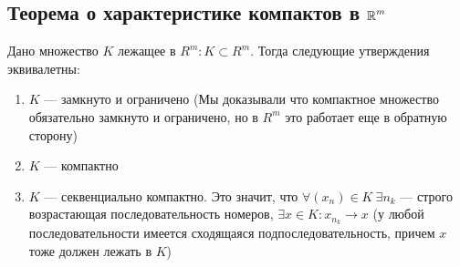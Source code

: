 \subsection{Теорема о характеристике компактов в $\operatorname*{\mathbb{R}}^m$}
Дано множество $K$ лежащее в $R^m: K \subset R^m$. Тогда следующие утверждения эквивалетны:
	\begin{enumerate}
	  \item $K$ --- замкнуто и ограничено (Мы доказывали что компактное множество обязательно замкнуто и ограничено, но в $R^m$ это работает еще в обратную сторону)
	  \item $K$ --- компактно
	  \item $K$ --- секвенциально компактно. Это значит, что $\forall (x_n) \in K  \ \exists n_k$ --- строго возрастающая последовательность номеров, $\exists x \in K: x_{n_k} \to x$ (у любой последовательности имеется сходящаяся подпоследовательность, причем $x$ тоже должен лежать в $K$)
	\end{enumerate}
	
